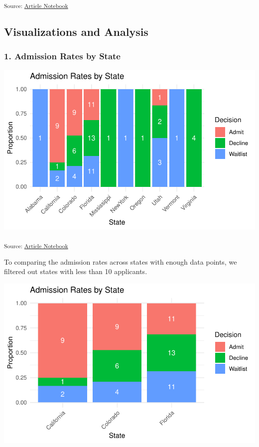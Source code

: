 \documentclass[
  letterpaper,
  DIV=11,
  numbers=noendperiod]{scrartcl}
\begin{document}
\textsubscript{Source:
\href{https://verkyyi.github.io/5900-hw1/index.qmd.html}{Article
Notebook}}

\subsection{Visualizations and
Analysis}\label{visualizations-and-analysis}

\subsubsection{1. Admission Rates by
State}\label{admission-rates-by-state}

\includegraphics{index_files/figure-pdf/admission-rates-by-state-1.pdf}

\textsubscript{Source:
\href{https://verkyyi.github.io/5900-hw1/index.qmd.html}{Article
Notebook}}

To comparing the admission rates across states with enough data points,
we filtered out states with less than 10 applicants.

\includegraphics{index_files/figure-pdf/unnamed-chunk-8-1.pdf}
\end{document}
